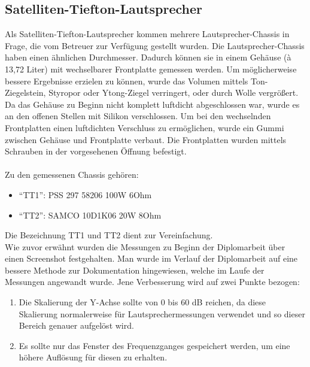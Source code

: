 \subsection*{Satelliten-Tiefton-Lautsprecher} \label{4.2.4}
Als Satelliten-Tiefton-Lautsprecher kommen mehrere Lautsprecher-Chassis in Frage, die vom Betreuer zur Verfügung gestellt wurden.
Die Lautsprecher-Chassis haben einen ähnlichen Durchmesser.
Dadurch können sie in einem Gehäuse (à 13,72 Liter) mit wechselbarer Frontplatte gemessen werden.
Um möglicherweise bessere Ergebnisse erzielen zu können, wurde das Volumen mittels Ton-Ziegelstein, Styropor oder Ytong-Ziegel verringert, oder durch Wolle vergrößert.\\
Da das Gehäuse zu Beginn nicht komplett luftdicht abgeschlossen war, wurde es an den offenen Stellen mit Silikon verschlossen.
Um bei den wechselnden Frontplatten einen luftdichten Verschluss zu ermöglichen, wurde ein Gummi zwischen Gehäuse und Frontplatte verbaut.
Die Frontplatten wurden mittels Schrauben in der vorgesehenen Öffnung befestigt.\\ \\
Zu den gemessenen Chassis gehören:
\begin{itemize}
	\item \enquote{TT1}: PSS 297 58206 100W 6Ohm
	\item \enquote{TT2}: SAMCO 10D1K06 20W 8Ohm
\end{itemize}
Die Bezeichnung TT1 und TT2 dient zur Vereinfachung.\\

Wie zuvor erwähnt wurden die Messungen zu Beginn der Diplomarbeit über einen Screenshot festgehalten.
Man wurde im Verlauf der Diplomarbeit auf eine bessere Methode zur Dokumentation hingewiesen, welche im Laufe der Messungen angewandt wurde.
Jene Verbesserung wird auf zwei Punkte bezogen:\\
\begin{enumerate}
	\item Die Skalierung der Y-Achse sollte von 0 bis 60 dB reichen, da diese Skalierung normalerweise für Lautsprechermessungen verwendet und so dieser Bereich genauer aufgelöst wird.
	\item Es sollte nur das Fenster des Frequenzganges gespeichert werden, um eine höhere Auflösung für diesen zu erhalten.
\end{enumerate}

